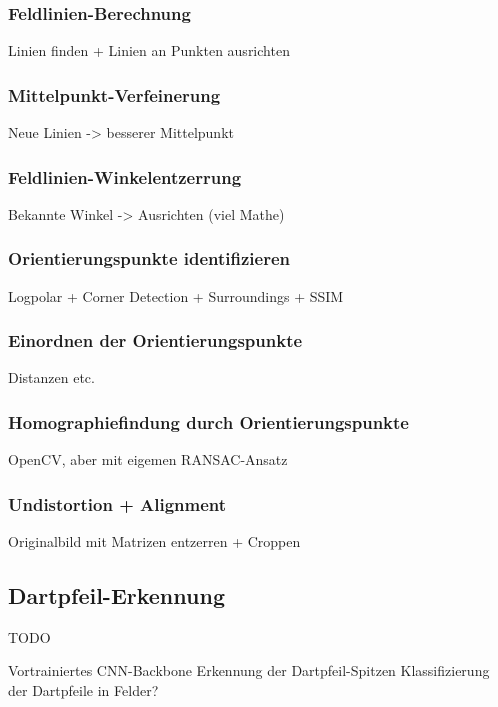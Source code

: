 \subsubsection{Feldlinien-Berechnung}
\label{sec:impl:align:field_lines}
Linien finden + Linien an Punkten ausrichten

\subsubsection{Mittelpunkt-Verfeinerung}
\label{sec:impl:align:center_fine}
Neue Linien -> besserer Mittelpunkt

\subsubsection{Feldlinien-Winkelentzerrung}
\label{sec:impl:align:undistort}
Bekannte Winkel -> Ausrichten (viel Mathe)

\subsubsection{Orientierungspunkte identifizieren}
\label{sec:impl:align:orient}
Logpolar + Corner Detection + Surroundings + SSIM

\subsubsection{Einordnen der Orientierungspunkte}
\label{sec:impl:align:sort_orient}
Distanzen etc.

\subsubsection{Homographiefindung durch Orientierungspunkte}
\label{sec:impl:align:homography}
OpenCV, aber mit eigemen RANSAC-Ansatz

\subsubsection{Undistortion + Alignment}
\label{sec:impl:align:alignment}
Originalbild mit Matrizen entzerren + Croppen


\subsection{Dartpfeil-Erkennung}
\label{sec:impl:arrows}

TODO

Vortrainiertes CNN-Backbone
Erkennung der Dartpfeil-Spitzen
Klassifizierung der Dartpfeile in Felder?
